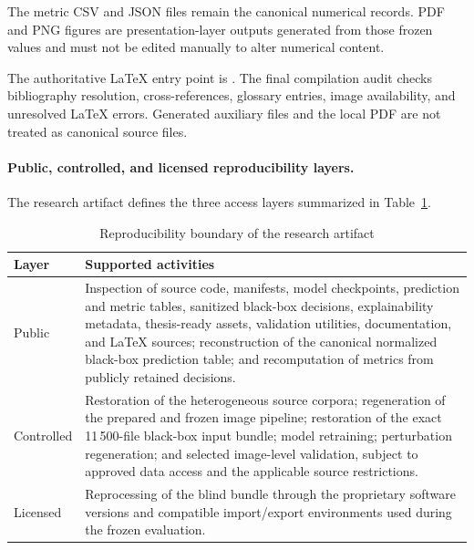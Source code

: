 The metric CSV and JSON files remain the canonical numerical records. PDF and
PNG figures are presentation-layer outputs generated from those frozen values
and must not be edited manually to alter numerical content.

The authoritative LaTeX entry point is
. The final compilation audit checks
bibliography resolution, cross-references, glossary entries, image
availability, and unresolved LaTeX errors. Generated auxiliary files and the
local PDF are not treated as canonical source files.

\paragraph{Public, controlled, and licensed reproducibility layers.}

The research artifact defines the three access layers summarized in
Table~\ref{tab:implementation-reproducibility-boundary}.

\begin{table}[H]
\centering
\small
\renewcommand{\arraystretch}{1.15}
\setlength{\tabcolsep}{5pt}
\caption{Reproducibility boundary of the research artifact}
\label{tab:implementation-reproducibility-boundary}
\begin{tabularx}{\textwidth}{@{}p{} X@{}}
\toprule
\textbf{Layer} &
\textbf{Supported activities} \\
\midrule

Public
&
Inspection of source code, manifests, model checkpoints, prediction and metric
tables, sanitized black-box decisions, explainability metadata, thesis-ready
assets, validation utilities, documentation, and LaTeX sources; reconstruction
of the canonical normalized black-box prediction table; and recomputation of
metrics from publicly retained decisions. \\

Controlled
&
Restoration of the heterogeneous source corpora; regeneration of the prepared
and frozen image pipeline; restoration of the exact 11\,500-file black-box
input bundle; model retraining; perturbation regeneration; and selected
image-level validation, subject to approved data access and the applicable
source restrictions. \\

Licensed
&
Reprocessing of the blind bundle through the proprietary software versions and
compatible import/export environments used during the frozen evaluation. \\

\bottomrule
\end{tabularx}
\end{table}

